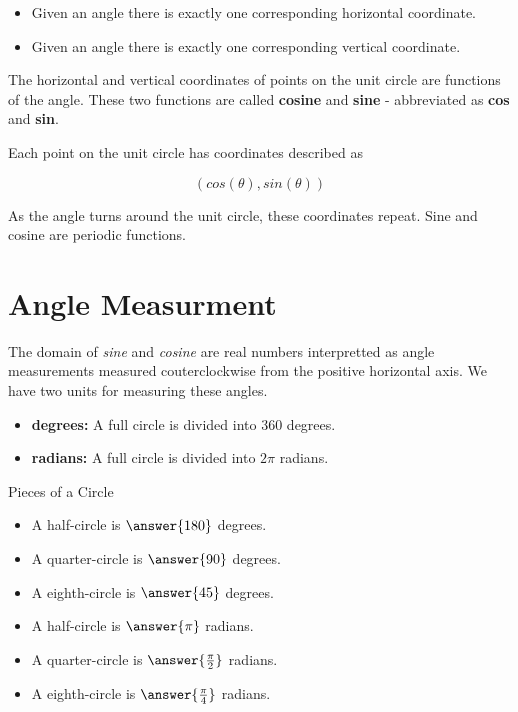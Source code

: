 \documentclass{ximera}
\begin{document}
\begin{example}
\begin{itemize}
\item Given an angle there is exactly one corresponding horizontal coordinate.
\item Given an angle there is exactly one corresponding vertical coordinate. 
\end{itemize}


The horizontal and vertical coordinates of points on the unit circle are functions of the angle.  These two functions are called \textbf{cosine} and \textbf{sine} - abbreviated as \textbf{cos} and \textbf{sin}.

Each point on the unit circle has coordinates described as 

\[  (cos(\theta), sin(\theta))  \] 

As the angle turns around the unit circle, these coordinates repeat. Sine and cosine are periodic functions.

\end{example}




\section{Angle Measurment}

The domain of \textit{sine} and \textit{cosine} are real numbers interpretted as angle measurements measured couterclockwise from the positive horizontal axis.  We have two units for measuring these angles.


\begin{itemize}
\item \textbf{degrees:}  A full circle is divided into $360$ degrees.
\item \textbf{radians:}  A full circle is divided into $2\pi$ radians.
\end{itemize}


\begin{question} Pieces of a Circle
	\begin{itemize}
		\item A half-circle is $\answer{180}$ degrees.
		\item A quarter-circle is $\answer{90}$ degrees.
		\item A eighth-circle is $\answer{45}$ degrees.
		\item A half-circle is $\answer{\pi}$ radians.
		\item A quarter-circle is $\answer{\frac{\pi}{2}}$ radians.
		\item A eighth-circle is $\answer{\frac{\pi}{4}}$ radians.

	\end{itemize}
\end{question}
\end{document}
